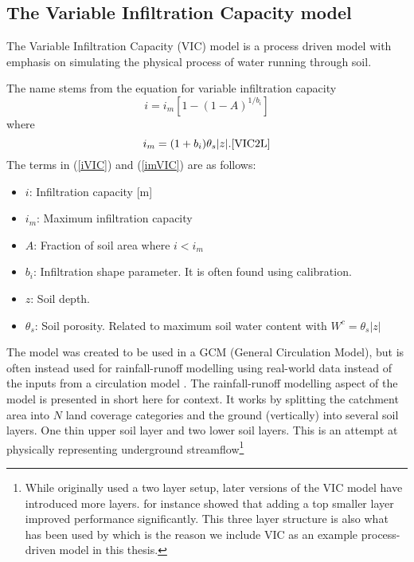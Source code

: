 \subsection{The Variable Infiltration Capacity model}
The Variable Infiltration Capacity (VIC) model \cite{VIC} is a process driven model 
with emphasis on simulating the physical process of water running through soil.

The name stems from the equation for variable infiltration capacity
\begin{equation}
    i = i_m \left[ 1 - (1-A)^{1/b_i}  \right] \label{iVIC}
\end{equation}
where
\begin{equation}
    i_m = (1+b_i)\theta_s|z|. \cite{VIC2L} \label{imVIC}
\end{equation}
The terms in (\ref{iVIC}) and (\ref{imVIC}) are as follows:
\begin{itemize}
    \item $i$: Infiltration capacity [m]
    \item $i_m$: Maximum infiltration capacity
    \item $A$: Fraction of soil area where $i < i_m$
    \item $b_i$: Infiltration shape parameter. It is often found using calibration.
    \item $z$: Soil depth.
    \item $\theta_s$: Soil porosity. Related to maximum soil water content with $W^c = \theta_s |z|$
\end{itemize}


The model was created to be used in a GCM (General Circulation Model), but is often 
instead used for rainfall-runoff modelling using real-world data instead of the inputs 
from a circulation model \citationneeded. The rainfall-runoff modelling aspect 
of the model is presented in short here for context. It works by splitting the catchment 
area into $N$ land coverage categories and the ground (vertically) into several soil layers. 
One thin  upper soil layer and two lower soil layers. This is an attempt at physically 
representing underground streamflow\footnote{While \cite{VIC} originally used a 
two layer setup, later versions of the VIC model have introduced more layers. 
\cite{VIC2L} for instance showed that adding a top smaller layer improved performance 
significantly. This three layer structure is also what has been used by \cite{VICbench} 
which is the reason we include VIC as an example process-driven model in this thesis.}

